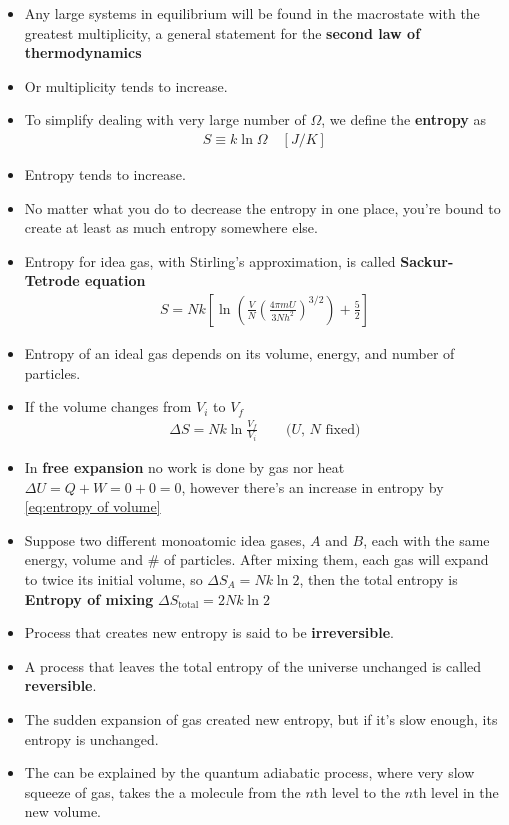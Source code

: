 \documentclass{book}
\begin{document}
\begin{itemize}
	\item Any large systems in equilibrium will be found in the macrostate with the greatest multiplicity,
	      a general statement for the \textbf{second law of thermodynamics}
	\item Or multiplicity tends to increase.
	\item To simplify dealing with very large number of $\Omega$, we define the \textbf{entropy} as
	      \begin{align}
		      \label{eq:entropy}
		      S \equiv k \ln{\Omega} \quad [\unit{J/K}]
	      \end{align}
	\item Entropy tends to increase.
	\item No matter what you do to decrease the entropy in one place, you're bound to create at least
	      as much entropy somewhere else.
	\item Entropy for idea gas, with Stirling's approximation, is called
	      \textbf{Sackur-Tetrode equation}
	      \begin{align}
		      S = Nk \left[
			      \ln{ \left( \frac{V}{N} \left( \frac{4\pi m U}{3Nh^2} \right)^{3/2} \right) + \frac{5}{2}}
			      \right]
	      \end{align}
	\item Entropy of an ideal gas depends on its volume, energy, and number of particles.
	\item If the volume changes from $V_i$ to $V_f$
	      \begin{align}
		      \label{eq:entropy of volume}
		      \Delta{S} = Nk \ln{\frac{V_f}{V_i}} \qquad \text{($U$, $N$ fixed)}
	      \end{align}
	\item In \textbf{free expansion} no work is done by gas nor heat
	      $\Delta{U} = Q + W = 0 + 0 =0$, however there's an increase in entropy by
	      \eqref{eq:entropy of volume}
	\item  Suppose two different monoatomic idea gases, $A$ and $B$,
	      each with the same energy, volume and \# of particles. After mixing them, each gas will expand
	      to twice its initial volume, so $\Delta{S_A} = Nk \ln{2}$, then the total entropy is
	      \textbf{Entropy of mixing} $\Delta{S_{\text{total}} = 2Nk \ln{2}}$
	\item Process that creates new entropy is said to be \textbf{irreversible}.

	\item A process that leaves the total entropy of the universe unchanged is called \textbf{reversible}.
	\item The sudden expansion of gas created new entropy, but if it's slow enough, its entropy is unchanged.
	\item The can be explained by the quantum adiabatic process, where very slow squeeze of gas, takes the a molecule
	      from the $n$th level to the $n$th level in the new volume.
\end{itemize}
\end{document}
